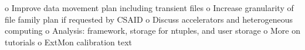 o Improve data movement plan including transient files
o Increase granularity of file family plan if requested by CSAID
o Discuss accelerators and heterogeneous computing
o Analysis: framework, storage for ntuples, and user storage
o More on tutorials
o ExtMon calibration text





